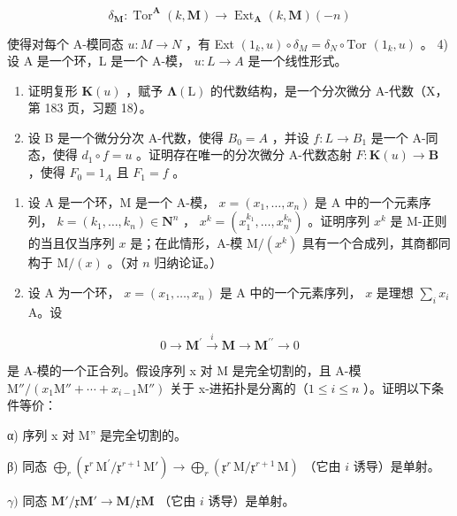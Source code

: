 \[
\delta_ {\mathbf {M}}: \operatorname{Tor} ^ {\mathbf {A}} (k, \mathbf {M}) \rightarrow \operatorname{Ext} _ {\mathbf {A}} (k, \mathbf {M}) (- n)
\]

使得对每个 A-模同态 \(u: M \to N\) ，有 Ext \((1_k, u) \circ \delta_M = \delta_N \circ \text{Tor } (1_k, u)\) 。 4) 设 A 是一个环，L 是一个 A-模， \(u: L \to A\) 是一个线性形式。

\begin{enumerate}
\def\labelenumi{\alph{enumi})}
\item
  证明复形 \(\mathbf{K}(u)\) ，赋予 \(\symbf{\Lambda}(\mathrm{L})\) 的代数结构，是一个分次微分 A-代数（X，第 183 页，习题 18）。
\item
  设 B 是一个微分分次 A-代数，使得 \(B_{0} = A\) ，并设 \(f : L \to B_{1}\) 是一个 A-同态，使得 \(d_{1} \circ f = u\) 。证明存在唯一的分次微分 A-代数态射 \(F : \mathbf{K}(u) \to \mathbf{B}\) ，使得 \(F_{0} = 1_{A}\) 且 \(F_{1} = f\) 。
\end{enumerate}

\begin{enumerate}
\def\labelenumi{\arabic{enumi})}
\setcounter{enumi}{4}
\item
  设 A 是一个环，M 是一个 A-模， \(x = (x_1, \ldots, x_n)\) 是 A 中的一个元素序列， \(k = (k_1, \ldots, k_n) \in \mathbf{N}^n\) ， \(x^k = (x_1^{k_1}, \ldots, x_{n}^{k_n})\) 。证明序列 \(x^k\) 是 M-正则的当且仅当序列 \(x\) 是；在此情形，A-模 \(\mathrm{M}/(x^k)\) 具有一个合成列，其商都同构于 \(\mathrm{M}/(x)\) 。（对 \(n\) 归纳论证。）
\item
  设 A 为一个环， \(x = (x_1, \ldots, x_n)\) 是 A 中的一个元素序列， \(x\) 是理想 \(\sum_{i} x_i\) A。设
\end{enumerate}

\[
0 \rightarrow \mathbf {M} ^ {\prime} \stackrel {i} {\rightarrow} \mathbf {M} \rightarrow \mathbf {M} ^ {\prime \prime} \rightarrow 0
\]

是 A-模的一个正合列。假设序列 x 对 M 是完全切割的，且 A-模 \(\mathrm{M}''/(x_{1}\mathrm{M}''+\cdots+x_{i-1}\mathrm{M}'')\) 关于 x-进拓扑是分离的（\(1\leqslant i\leqslant n\) ）。证明以下条件等价：

α) 序列 x 对 M'' 是完全切割的。

β) 同态 \(\bigoplus_{r} (\mathfrak{x}^{r} \, \mathrm{M}^{\prime}/\mathfrak{x}^{r+1} \, \mathrm{M}') \to \bigoplus_{r} (\mathfrak{x}^{r} \, \mathrm{M}/\mathfrak{x}^{r+1} \, \mathrm{M})\) （它由 \(i\) 诱导）是单射。

\(\gamma)\) 同态 \(\mathbf{M}' / \mathfrak{x}\mathbf{M}' \to \mathbf{M} / \mathfrak{x}\mathbf{M}\) （它由 \(i\) 诱导）是单射。

